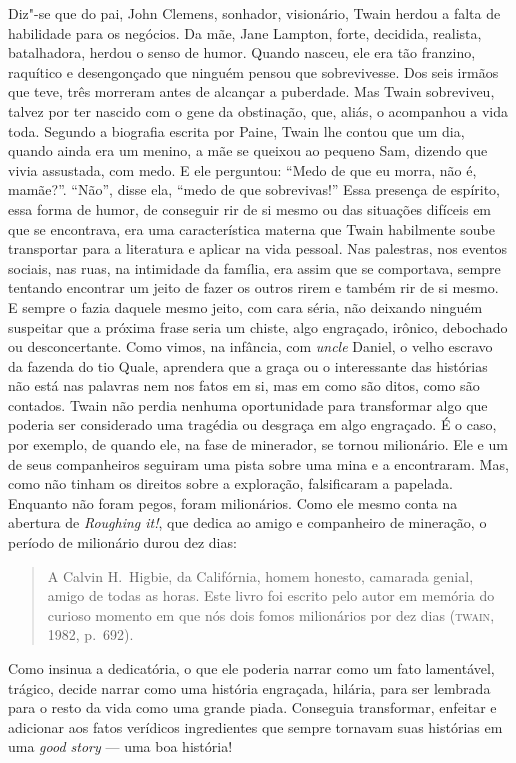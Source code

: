 Diz"-se que do pai, John Clemens, sonhador, visionário, Twain herdou a
falta de habilidade para os negócios. Da mãe, Jane Lampton, forte,
decidida, realista, batalhadora, herdou o senso de humor. Quando nasceu,
ele era tão franzino, raquítico e desengonçado que ninguém pensou que
sobrevivesse. Dos seis irmãos que teve, três morreram antes de alcançar a
puberdade. Mas Twain sobreviveu, talvez por ter nascido com o gene da
obstinação, que, aliás, o acompanhou a vida toda. Segundo a biografia
escrita por Paine, Twain lhe contou que um dia, quando ainda era um menino, a mãe
se queixou ao pequeno Sam, dizendo que vivia assustada, com medo. E ele
perguntou: ``Medo de que eu morra, não é, mamãe?''. ``Não'', disse ela,
``medo de que sobrevivas!'' Essa presença de espírito, essa forma
de humor, de conseguir rir de si mesmo ou das
situações difíceis em que se encontrava, era uma característica materna
que Twain habilmente soube transportar para a literatura e
aplicar na vida pessoal. Nas palestras, nos eventos sociais, nas ruas, na
intimidade da família, era assim que se comportava, sempre tentando
encontrar um jeito de fazer os outros rirem e também rir de si mesmo. E sempre o
fazia daquele mesmo jeito, com cara séria, não deixando ninguém
suspeitar que a próxima frase seria um chiste, algo
engraçado, irônico, debochado ou desconcertante. Como vimos, na infância,
com \textit{uncle} Daniel, o velho escravo da fazenda do tio Quale, aprendera que a
graça ou o interessante das histórias não está nas palavras nem nos fatos
em si, mas em como são ditos, como são contados. Twain não perdia nenhuma
oportunidade para transformar algo que poderia ser considerado uma
tragédia ou desgraça em algo engraçado. É o caso, por exemplo, de quando
ele, na fase de minerador, se tornou milionário. Ele e um de seus
companheiros seguiram uma pista sobre uma mina e a encontraram. Mas, como
não tinham os direitos sobre a exploração, falsificaram a papelada.
Enquanto não foram pegos, foram milionários. Como ele mesmo conta na
abertura de \textit{Roughing it!}, que dedica ao amigo e companheiro de
mineração, o período de milionário durou dez dias:

\begin{quote}
A Calvin H.~Higbie, da Califórnia, homem honesto, camarada genial, amigo de todas as
horas. Este livro foi escrito pelo autor em memória do curioso momento em que
nós dois fomos milionários por dez dias (\textsc{twain}, 1982, p.~692).
\end{quote}

Como insinua a dedicatória, o que ele poderia narrar como um fato
lamentável, trágico, decide narrar como uma história engraçada, hilária,
para ser lembrada para o resto da vida como uma grande piada. Conseguia
transformar, enfeitar e adicionar aos fatos verídicos ingredientes que
sempre tornavam suas histórias em uma \textit{good story} --- uma boa história!

